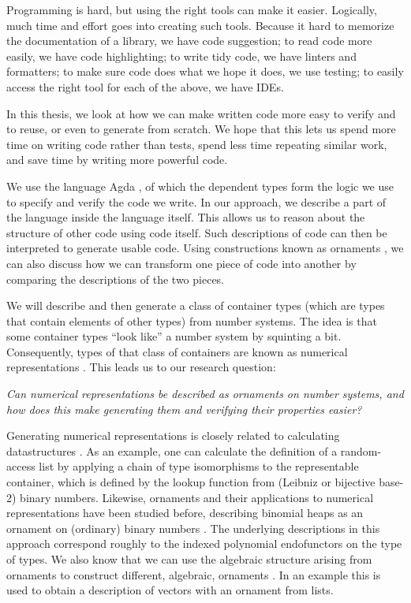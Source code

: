 Programming is hard, but using the right tools can make it easier. Logically, much time and effort goes into creating such tools. Because it hard to memorize the documentation of a library, we have code suggestion; to read code more easily, we have code highlighting; to write tidy code, we have linters and formatters; to make sure code does what we hope it does, we use testing; to easily access the right tool for each of the above, we have IDEs. 

In this thesis, we look at how we can make written code more easy to verify and to reuse, or even to generate from scratch. We hope that this lets us spend more time on writing code rather than tests, spend less time repeating similar work, and save time by writing more powerful code.

We use the language Agda \cite{agda}, of which the dependent types form the logic we use to specify and verify the code we write. In our approach, we describe a part of the language inside the language itself. This allows us to reason about the structure of other code using code itself. Such descriptions of code can then be interpreted to generate usable code. Using constructions known as ornaments \cite{algorn, sijsling}, we can also discuss how we can transform one piece of code into another by comparing the descriptions of the two pieces.

We will describe and then generate a class of container types (which are types that contain elements of other types) from number systems. The idea is that some container types ``look like'' a number system by squinting a bit. Consequently, types of that class of containers are known as numerical representations \cite{purelyfunctional}. This leads us to our research question:

\textit{Can numerical representations be described as ornaments on number systems, and how does this make generating them and verifying their properties easier?}

Generating numerical representations is closely related to calculating datastructures \cite{calcdata}. As an example, one can calculate the definition of a random-access list by applying a chain of type isomorphisms to the representable container, which is defined by the lookup function from (Leibniz or bijective base-2) binary numbers. Likewise, ornaments and their applications to numerical representations have been studied before, describing binomial heaps as an ornament on (ordinary) binary numbers \cite{progorn}. The underlying descriptions in this approach correspond roughly to the indexed polynomial endofunctors on the type of types. We also know that we can use the algebraic structure arising from ornaments to construct different, algebraic, ornaments \cite{algorn}. In an example this is used to obtain a description of vectors with an ornament from lists.

